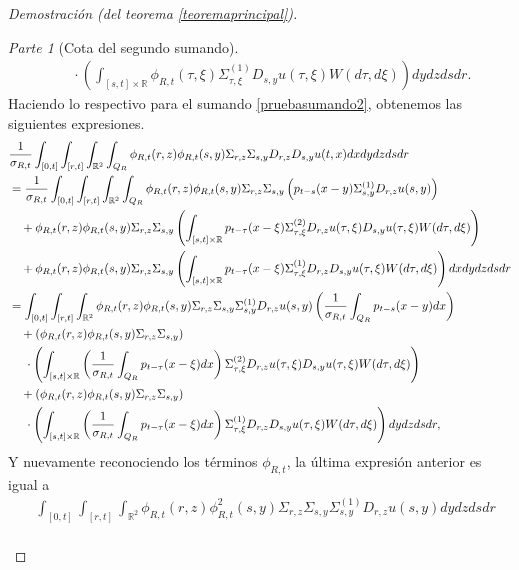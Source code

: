 \documentclass[letterpaper,twoside,12pt]{book}
\newcommand{\R}{\mathbb{R}}
\newcommand{\1}{\mathds{1}}
\theoremstyle{definition}
\theoremstyle{definition}
\theoremstyle{remark}
\newtheorem{proofpart}{Parte}
\theoremstyle{definition}
\theoremstyle{definition}
\theoremstyle{definition}
\theoremstyle{definition}
\theoremstyle{definition}
\begin{document}
\begin{proof}[Demostración (del teorema \ref{teoremaprincipal})]
\begin{proofpart}[Cota del segundo sumando]
\begin{align}
      &\ \ \ \ \cdot\left(\int_{[s,t]\times\R} \phi_{R,t}(\tau,\xi)\Sigma^{(1)}_{\tau,\xi}D_{s,y}u(\tau,\xi)W(d\tau,d\xi)\right)dy dz ds dr\label{pruebasumando4}.
   \end{align}
Haciendo lo respectivo para el sumando \eqref{pruebasumando2}, obtenemos las siguientes expresiones.
\begin{align}
   &\frac{1}{\sigma_{R,t}}\int_{[0,t]}\int_{[r,t]}\int_{\R^2}\int_{Q_R}\phi_{R,t}(r,z)\phi_{R,t}(s,y)\Sigma_{r,z}\Sigma_{s,y}D_{r,z}D_{s,y}u(t,x)dx dy dz ds dr\notag\\
   &=\frac{1}{\sigma_{R,t}}\int_{[0,t]}\int_{[r,t]}\int_{\R^2}\int_{Q_R}\phi_{R,t}(r,z)\phi_{R,t}(s,y)\Sigma_{r,z}\Sigma_{s,y}\left( p_{t-s}(x-y)\Sigma^{(1)}_{s,y}D_{r,z}u(s,y)\right)\notag\\
   &\ \ \ +\phi_{R,t}(r,z)\phi_{R,t}(s,y)\Sigma_{r,z}\Sigma_{s,y}\left(\int_{[s,t]\times \R} p_{t-\tau}(x-\xi)\Sigma^{(2)}_{\tau,\xi}D_{r,z}u(\tau,\xi)D_{s,y}u(\tau,\xi)W(d\tau,d\xi)\right)\notag\\
   &\ \ \ +\phi_{R,t}(r,z)\phi_{R,t}(s,y)\Sigma_{r,z}\Sigma_{s,y} \left(\int_{[s,t]\times \R}p_{t-\tau}(x-\xi)\Sigma^{(1)}_{\tau,\xi}D_{r,z}D_{s,y}u(\tau,\xi)W(d\tau,d\xi)\right) dx dy dz ds dr\notag\\
   &=\int_{[0,t]}\int_{[r,t]}\int_{\R^2}\phi_{R,t}(r,z)\phi_{R,t}(s,y)\Sigma_{r,z}\Sigma_{s,y}\Sigma^{(1)}_{s,y}D_{r,z}u(s,y)\left(\frac{1}{\sigma_{R,t}}\int_{Q_R} p_{t-s}(x-y)dx\right)\notag\\
   &\ \ \ +\left(\phi_{R,t}(r,z)\phi_{R,t}(s,y)\Sigma_{r,z}\Sigma_{s,y}\right)\notag\\
   & \ \ \ \ \cdot\left(\int_{[s,t]\times \R} \left(\frac{1}{\sigma_{R,t}}\int_{Q_R} p_{t-\tau}(x-\xi)dx\right)\Sigma^{(2)}_{\tau,\xi}D_{r,z}u(\tau,\xi)D_{s,y}u(\tau,\xi)W(d\tau,d\xi)\right)\notag\\
   &\ \ \ +\left(\phi_{R,t}(r,z)\phi_{R,t}(s,y)\Sigma_{r,z}\Sigma_{s,y}\right)\notag\\
   &\ \ \ \ \cdot \left(\int_{[s,t]\times \R}\left(\frac{1}{\sigma_{R,t}}\int_{Q_R} p_{t-\tau}(x-\xi)dx\right)\Sigma^{(1)}_{\tau,\xi}D_{r,z}D_{s,y}u(\tau,\xi)W(d\tau,d\xi)\right) dy dz ds dr,\notag
\end{align}
Y nuevamente reconociendo los términos $\phi_{R,t}$, la última expresión anterior es igual a
\begin{align}
   &\int_{[0,t]}\int_{[r,t]}\int_{\R^2}\phi_{R,t}(r,z)\phi_{R,t}^2(s,y)\Sigma_{r,z}\Sigma_{s,y}\Sigma^{(1)}_{s,y}D_{r,z}u(s,y)dy dz ds dr\label{pruebasumando5}\\

\end{align}
\end{proofpart}
\end{proof}
\end{document}
